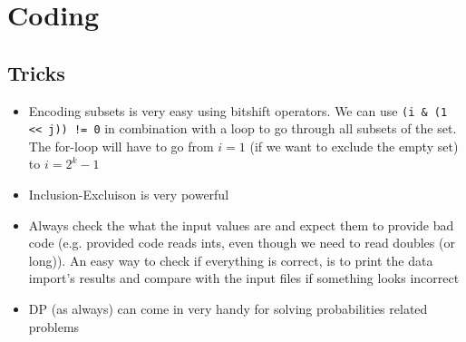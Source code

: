 \newsection
\section{Coding}
\label{sec:implementation}
\subsection{Tricks}
\begin{itemize}
    \item Encoding subsets is very easy using bitshift operators. We can use \verb|(i & (1 << j)) != 0| in combination with a loop to go through all subsets of the set. The for-loop will have to go from $i = 1$ (if we want to exclude the empty set) to $i = 2^k - 1$
    \item Inclusion-Excluison is very powerful
    \item Always check the what the input values are and expect them to provide bad code (e.g. provided code reads ints, even though we need to read doubles (or long)). An easy way to check if everything is correct, is to print the data import's results and compare with the input files if something looks incorrect
    \item DP (as always) can come in very handy for solving probabilities related problems
\end{itemize}

